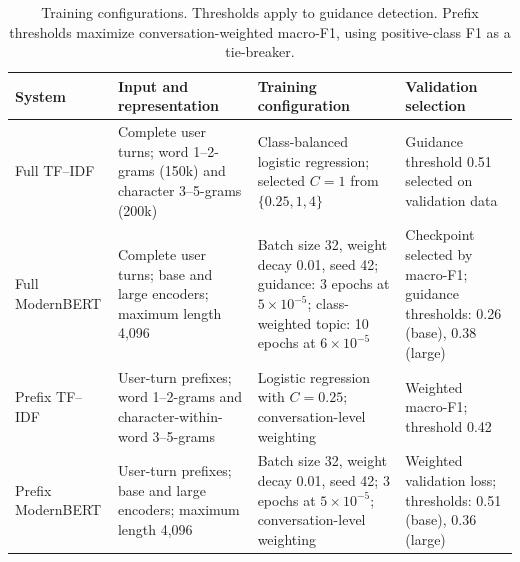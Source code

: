 \begin{table}[!htbp]
\centering
\scriptsize
\setlength{\tabcolsep}{3pt}
\begin{tabular}{@{}p{}p{}p{}p{}@{}}
\toprule
System & Input and representation & Training configuration & Validation selection \\
\midrule
Full TF--IDF
& Complete user turns; word 1--2-grams (150k) and character 3--5-grams (200k)
& Class-balanced logistic regression; selected $C=1$ from $\{0.25,1,4\}$
& Guidance threshold 0.51 selected on validation data \\
\addlinespace
Full ModernBERT
& Complete user turns; base and large encoders; maximum length 4,096
& Batch size 32, weight decay 0.01, seed 42; guidance: 3 epochs at $5\times10^{-5}$; class-weighted topic: 10 epochs at $6\times10^{-5}$
& Checkpoint selected by macro-F1; guidance thresholds: 0.26 (base), 0.38 (large) \\
\addlinespace
Prefix TF--IDF
& User-turn prefixes; word 1--2-grams and character-within-word 3--5-grams
& Logistic regression with $C=0.25$; conversation-level weighting
& Weighted macro-F1; threshold 0.42 \\
\addlinespace
Prefix ModernBERT
& User-turn prefixes; base and large encoders; maximum length 4,096
& Batch size 32, weight decay 0.01, seed 42; 3 epochs at $5\times10^{-5}$; conversation-level weighting
& Weighted validation loss; thresholds: 0.51 (base), 0.36 (large) \\
\bottomrule
\end{tabular}
\caption{Training configurations. Thresholds apply to guidance detection. Prefix thresholds maximize conversation-weighted macro-F1, using positive-class F1 as a tie-breaker.}
\label{tab:training-config}
\end{table}